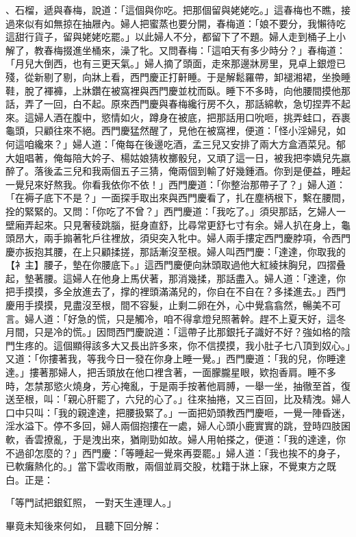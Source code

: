 \begin{showcontents}{}
、石榴，遞與春梅，說道：「這個與你吃。把那個留與姥姥吃。」這春梅也不瞧，接過來似有如無掠在抽屜內。婦人把蜜蒸也要分開，春梅道：「娘不要分，我懶待吃這甜行貨子，留與姥姥吃罷。」以此婦人不分，都留下了不題。婦人走到桶子上小解了，教春梅掇進坐桶來，澡了牝。又問春梅：「這咱天有多少時分？」春梅道：「月兒大倒西，也有三更天氣。」婦人摘了頭面，走來那邊牀房里，見卓上銀燈已殘，從新剔了剔，向牀上看，西門慶正打鼾睡。于是解鬆羅帶，卸褪湘裙，坐換睡鞋，脫了褌褲，上牀鑽在被窩裡與西門慶並枕而臥。睡下不多時，向他腰間摸他那話，弄了一回，白不起。原來西門慶與春梅纔行房不久，那話綿軟，急切捏弄不起來。這婦人酒在腹中，慾情如火，蹲身在被底，把那話用口吮咂，挑弄蛙口，吞裹龜頭，只顧往來不絕。西門慶猛然醒了，見他在被窩裡，便道：「怪小淫婦兒，如何這咱纔來？」婦人道：「俺每在後邊吃酒，孟三兒又安排了兩大方盒酒菜兒。郁大姐唱著，俺每陪大妗子、楊姑娘猜枚擲骰兒，又頑了這一日，被我把李嬌兒先嬴醉了。落後孟三兒和我兩個五子三猜，俺兩個到輸了好幾鍾酒。你到是便益，睡起一覺兒來好熬我。你看我依你不依！」西門慶道：「你整治那帶子了？」婦人道：「在褥子底下不是？」一面探手取出來與西門慶看了，扎在塵柄根下，繫在腰間，拴的緊緊的。又問：「你吃了不曾？」西門慶道：「我吃了。」須臾那話，乞婦人一壁廂弄起來。只見奢稜跳腦，挺身直舒，比尋常更舒七寸有余。婦人扒在身上，龜頭昂大，兩手搧著牝戶往裡放，須臾突入牝中。婦人兩手摟定西門慶脖項，令西門慶亦扳抱其腰，在上只顧揉搓，那話漸沒至根。婦人叫西門慶：「達達，你取我的【衤主】腰子，墊在你腰底下。」這西門慶便向牀頭取過他大紅綾抹胸兒，四摺叠起，墊著腰。這婦人在他身上馬伏著，那消幾揉，那話盡入。婦人道：「達達，你把手摸摸，多全放進去了，撑的裡頭滿滿兒的，你自在不自在？多揉進去。」西門慶用手摸摸，見盡沒至根，間不容髮，止剩二卵在外，心中覺翕翕然，暢美不可言。婦人道：「好急的慌，只是觸冷，咱不得拿燈兒照著幹。趕不上夏天好，這冬月間，只是冷的慌。」因問西門慶說道：「這帶子比那銀托子識好不好？強如格的陰門生疼的。這個顯得該多大又長出許多來，你不信摸摸，我小肚子七八頂到奴心。」又道：「你摟著我，等我今日一發在你身上睡一覺。」西門慶道：「我的兒，你睡達達。」摟著那婦人，把舌頭放在他口裡含著，一面朦朧星眼，欵抱香肩。睡不多時，怎禁那慾火燒身，芳心掩亂，于是兩手按著他肩膊，一舉一坐，抽徹至首，復送至根，叫：「親心肝罷了，六兒的心了。」往來抽捲，又三百回，比及精洩。婦人口中只叫：「我的親達達，把腰扱緊了。」一面把奶頭教西門慶咂，一覺一陣昏迷，淫水溢下。停不多回，婦人兩個抱摟在一處，婦人心頭小鹿實實的跳，登時四肢囷軟，香雲撩亂，于是洩出來，猶剛勁如故。婦人用帕搽之，便道：「我的達達，你不過卻怎麼的？」西門慶：「等睡起一覺來再耍罷。」婦人道：「我也挨不的身子，已軟癱熱化的。」當下雲收雨散，兩個並肩交股，枕籍于牀上寐，不覺東方之既白。正是：

「等門試把銀釭照，  一對天生連理人。」

畢竟未知後來何如，  且聽下回分解：






\end{showcontents}



